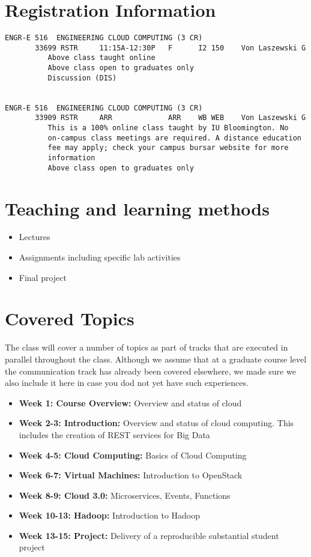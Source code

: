 \section{Registration Information}

\begin{verbatim}
ENGR-E 516  ENGINEERING CLOUD COMPUTING (3 CR)
       33699 RSTR     11:15A-12:30P   F      I2 150    Von Laszewski G
          Above class taught online
          Above class open to graduates only
          Discussion (DIS)


ENGR-E 516  ENGINEERING CLOUD COMPUTING (3 CR)
       33909 RSTR     ARR             ARR    WB WEB    Von Laszewski G
          This is a 100% online class taught by IU Bloomington. No
          on-campus class meetings are required. A distance education
          fee may apply; check your campus bursar website for more
          information
          Above class open to graduates only
\end{verbatim}


\section{Teaching and learning methods}


\begin{itemize}
\item Lectures
\item Assignments including specific lab activities
\item Final project 
\end{itemize}

\section{Covered Topics}

The class will cover a number of topics as part of tracks that are
executed in parallel throughout the class. Although we assume that at
a graduate course level the communication track has already been
covered elsewhere, we made sure we also include it here in case you dod
not yet have such experiences.

\begin{itemize}

\item {\bf Week 1: Course Overview:} Overview and status of cloud
\item {\bf Week 2-3: Introduction:} Overview and status of cloud
  computing. This includes the creation of REST services for Big Data
\item {\bf Week 4-5: Cloud Computing:} Basics of Cloud Computing 
\item {\bf Week 6-7: Virtual Machines:} Introduction to OpenStack
\item {\bf Week 8-9: Cloud 3.0:} Microservices, Events, Functions  
\item {\bf Week 10-13: Hadoop:} Introduction to Hadoop
\item {\bf Week 13-15: Project:} Delivery of a reproducible
  substantial student project
 
\end{itemize}

